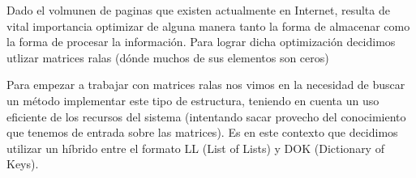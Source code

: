 \par Dado el volmunen de paginas que existen actualmente en Internet, resulta de vital importancia 
optimizar de alguna manera tanto la forma de almacenar
como la forma de procesar la informaci\'on. Para lograr dicha optimizaci\'on decidimos utlizar matrices ralas
 (d\'onde muchos de sus elementos son ceros)
\par Para empezar a trabajar con matrices ralas nos vimos en la necesidad de buscar un método implementar
 este tipo de estructura, teniendo en cuenta un uso eficiente de los recursos del sistema 
 (intentando sacar provecho del conocimiento que tenemos de entrada sobre las matrices). 
Es en este contexto que decidimos utilizar un h\'ibrido entre el formato LL (List of Lists) y 
DOK (Dictionary of Keys).\newline
